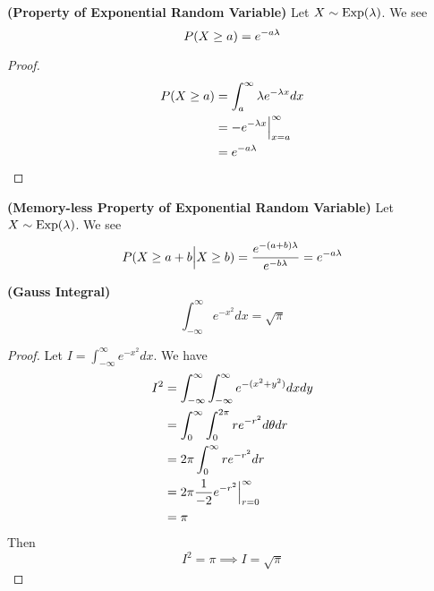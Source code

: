 \documentclass{report}
\begin{document}
\begin{theorem}
\label{2.3.5}
\textbf{(Property of Exponential Random Variable)} Let $X\sim \text{Exp}(\lambda )$. We see 
\begin{equation}
P(X\geq a )=e^{-a\lambda }
\end{equation}
\end{theorem}
\begin{proof}
\begin{align}
P(X\geq a)&=\int_a^\infty \lambda e^{-\lambda x}dx\\
&=-e^{-\lambda x}\Big |_{x=a}^\infty\\
&=e^{-a\lambda }
\end{align}
\end{proof}
\begin{theorem}
\label{2.3.6}
\textbf{(Memory-less Property of Exponential Random Variable)}  Let $X\sim \text{Exp}(\lambda )$. We see
\begin{equation}
P(X\geq  a+b \Big |  X\geq  b)=\frac{e^{-(a+b)\lambda }}{e^{-b\lambda }}=e^{-a\lambda }
\end{equation}
\end{theorem}
\begin{theorem}
\label{2.3.7}
\textbf{(Gauss Integral)}
\begin{equation}
\int_{-\infty}^\infty e^{-x^2}dx=\sqrt{\pi} 
\end{equation}
\end{theorem}
\begin{proof}
Let $I=\int_{-\infty}^\infty e^{-x^2}dx$. We have
\begin{align}
I^2&=\int_{-\infty}^\infty \int_{-\infty}^\infty e^{-(x^2+y^2)}dxdy\\
&=\int_0^\infty \int_0^{2\pi} re^{-r^2}d\theta dr\\
&=2\pi \int_0^{\infty}re^{-r^2}dr\\
&=2\pi \frac{1}{-2}e^{-r^2}\Big |_{r=0}^\infty\\
&=\pi
\end{align}
Then
\begin{equation}
I^2=\pi \implies I=\sqrt{\pi} 
\end{equation}
\end{proof}
\end{document}
